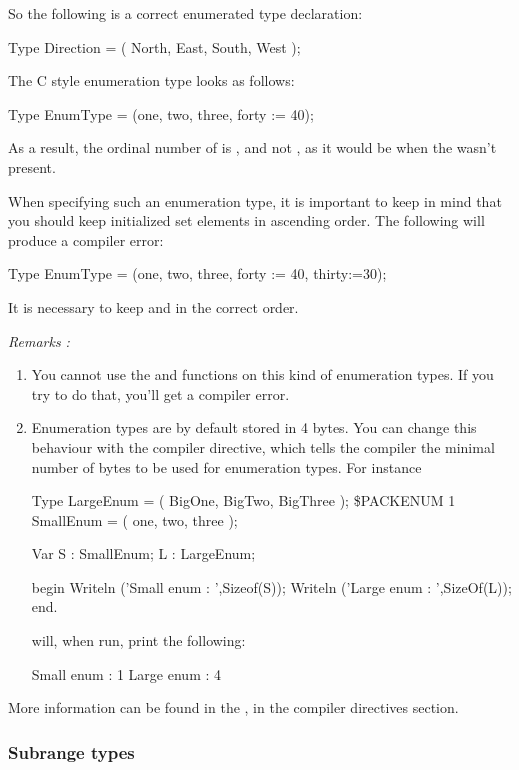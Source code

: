 \documentclass{report}
\begin{document}


So the following is a correct enumerated type declaration:
\begin{listing}
Type
  Direction = ( North, East, South, West );
\end{listing}

The C style enumeration type looks as follows:
\begin{listing}
Type
  EnumType = (one, two, three, forty := 40);
\end{listing}
As a result, the ordinal number of  is , and not ,
as it would be when the  wasn't present.

When specifying such an enumeration type, it is important to keep in mind
that you should keep initialized set elements in ascending order. The
following will produce a compiler error:
\renewcommand{\prelisting}{\sffamily}
\begin{listing}
Type
  EnumType = (one, two, three, forty := 40, thirty:=30);
\end{listing}
It is necessary to keep  and  in the correct order.

{\em Remarks :}
\begin{enumerate}
\item You cannot use the  and  functions on
this kind of enumeration types. If you try to do that, you'll get a compiler
error.
\item Enumeration types are by default stored in 4 bytes. You can change
this behaviour with the  compiler directive, which
tells the compiler the minimal number of bytes to be used for enumeration
types.
For instance
\begin{listing}

Type 
  LargeEnum = ( BigOne, BigTwo, BigThree );
{\$PACKENUM 1}
  SmallEnum = ( one, two, three );

Var S : SmallEnum;
    L : LargeEnum;

begin
  Writeln ('Small enum : ',Sizeof(S));
  Writeln ('Large enum : ',SizeOf(L));
end.
\end{listing}
will, when run, print the following: 
\begin{listing}
Small enum : 1
Large enum : 4
\end{listing}
\end{enumerate}
More information can be found in the \progref, in the compiler directives
section.

\subsubsection{Subrange types}
\end{document}
